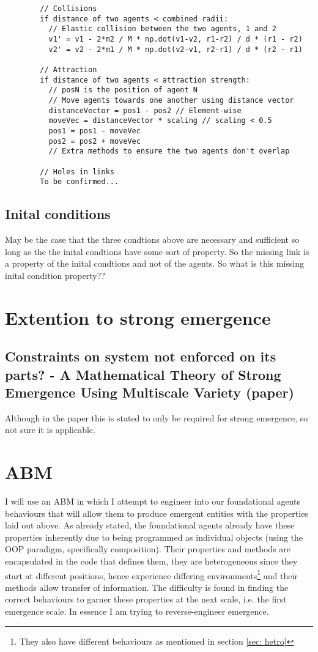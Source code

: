 \documentclass{article}
\begin{document}
      \begin{verbatim}
        // Collisions
        if distance of two agents < combined radii:
          // Elastic collision between the two agents, 1 and 2
          v1' = v1 - 2*m2 / M * np.dot(v1-v2, r1-r2) / d * (r1 - r2) 
          v2' = v2 - 2*m1 / M * np.dot(v2-v1, r2-r1) / d * (r2 - r1)

        // Attraction
        if distance of two agents < attraction strength:
          // posN is the position of agent N
          // Move agents towards one another using distance vector 
          distanceVector = pos1 - pos2 // Element-wise 
          moveVec = distanceVector * scaling // scaling < 0.5
          pos1 = pos1 - moveVec
          pos2 = pos2 + moveVec
          // Extra methods to ensure the two agents don't overlap

        // Holes in links
        To be confirmed...
      \end{verbatim}

  
  \subsection{Inital conditions}
    
    May be the case that the three condtions above are necessary and sufficient so long as the the inital condtions have some sort of property. So the missing link is a property of the inital condtions and not of the agents. So what is this missing inital condition property??


\section{Extention to strong emergence}
  \subsection{Constraints on system not enforced on its parts? - A Mathematical Theory of Strong Emergence Using Multiscale Variety (paper)}
    Although in the paper this is stated to only be required for strong emergence, so not sure it is applicable.


\section{ABM}

  I will use an ABM in which I attempt to engineer into our foundational agents behaviours that will allow them to produce emergent entities with the properties laid out above. As already stated, the foundational agents already have these properties inherently due to being programmed as individual objects (using the OOP paradigm, specifically composition). Their properties and methods are encapsulated in the code that defines them, they are heterogeneous since they start at different positions, hence experience differing environments\footnote{They also have different behaviours as mentioned in section \ref{sec: hetro}} and their methods allow transfer of information. The difficulty is found in finding the correct behaviours to garner these properties at the next scale, i.e. the first emergence scale. In essence I am trying to reverse-engineer emergence.
\end{document}
